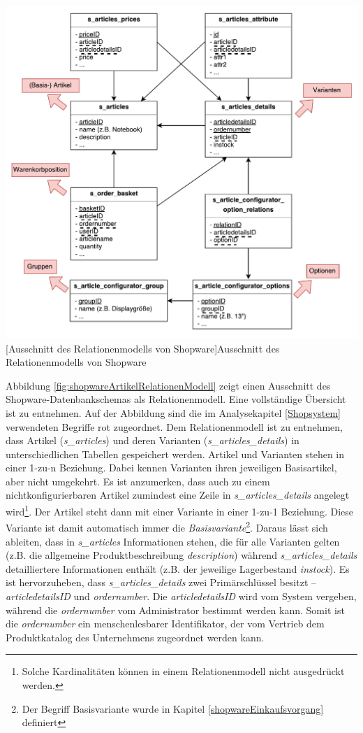 \documentclass[11pt, a4paper, titlepage, listof=totoc, bibliography=totoc, index=totoc, twoside, openright, headings=normal]{scrreprt}
\begin{document}
\vspace{1em}
\begin{minipage}{\linewidth}
	\centering
	\includegraphics[width=0.7\linewidth]{Abbildungen/shopwareArtikelRelationenModell.pdf}
	[Ausschnitt des Relationenmodells von Shopware]{Ausschnitt des Relationenmodells von Shopware}
	\label{fig:shopwareArtikelRelationenModell}
\end{minipage}
\vspace{0.3em}

Abbildung \ref{fig:shopwareArtikelRelationenModell} zeigt einen Ausschnitt des Shopware-Datenbankschemas als Relationenmodell. Eine vollständige Übersicht ist \citet{shopwareDatabaseScheme} zu entnehmen. Auf der Abbildung sind die im Analysekapitel \ref{Shopsystem} verwendeten Begriffe rot zugeordnet. Dem Relationenmodell ist zu entnehmen, dass Artikel (\emph{s\_articles}) und deren Varianten (\emph{s\_articles\_details}) in unterschiedlichen Tabellen gespeichert werden. Artikel und Varianten stehen in einer 1-zu-n Beziehung. Dabei kennen Varianten ihren jeweiligen Basisartikel, aber nicht umgekehrt. Es ist anzumerken, dass auch zu einem nichtkonfigurierbaren Artikel zumindest eine Zeile in \emph{s\_articles\_details} angelegt wird\footnote{Solche Kardinalitäten können in einem Relationenmodell nicht ausgedrückt werden.}. Der Artikel steht dann mit einer Variante in einer 1-zu-1 Beziehung. Diese Variante ist damit automatisch immer die \emph{Basisvariante}\footnote{Der Begriff Basisvariante wurde in Kapitel \ref{shopwareEinkaufsvorgang} definiert}. Daraus lässt sich ableiten, dass in \emph{s\_articles} Informationen stehen, die für alle Varianten gelten (z.B. die allgemeine Produktbeschreibung \emph{description}) während \emph{s\_articles\_details} detailliertere Informationen enthält (z.B. der jeweilige Lagerbestand \emph{instock}). Es ist hervorzuheben, dass \emph{s\_articles\_details} zwei Primärschlüssel besitzt -- \emph{articledetailsID} und \emph{ordernumber}. Die \emph{articledetailsID} wird vom System vergeben, während die \emph{ordernumber} vom Administrator bestimmt werden kann. Somit ist die \emph{ordernumber} ein menschenlesbarer Identifikator, der vom Vertrieb dem Produktkatalog des Unternehmens zugeordnet werden kann.
\end{document}
